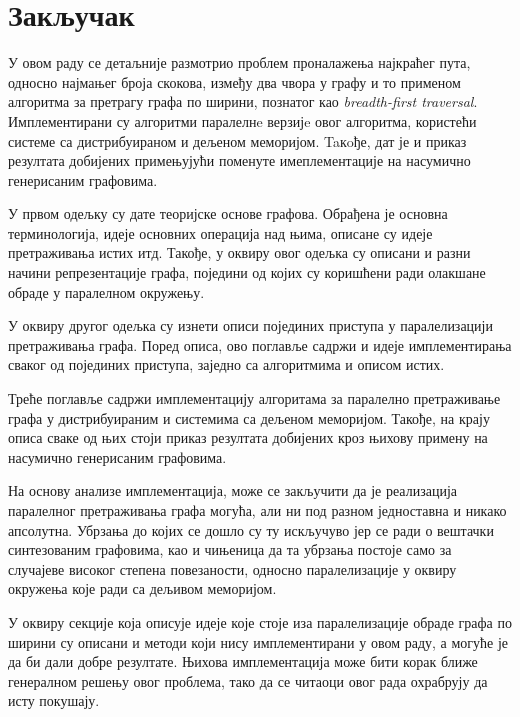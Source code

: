 \chapter{Закључак}
У овом раду се детаљније размотрио проблем проналажења најкраћег пута, односно најмањег броја скокова, између два чвора у графу и то применом алгоритма за претрагу графа по ширини, познатог као \textit{breadth-first traversal}. Имплементирани су алгоритми паралелнe верзијe овог алгоритма, користећи системе са дистрибуираном и дељеном меморијом. Taкoђе, дат је и приказ резултата добијених примењујући поменуте имеплементације на насумично генерисаним графовима.

\par
У првом одељку су дате теоријске основе графова. Обрађена је основна терминологија, идеје основних операција над њима, описане су идеје претраживања истих итд. Такође, у оквиру овог одељка су описани и разни начини репрезентације графа, поједини од којих су коришћени ради олакшане обраде у паралелном окружењу.

\par
У оквиру другог одељка су изнети описи појединих приступа у паралелизацији претраживања графа. Поред описа, ово поглавље садржи и идеје имплементирања сваког од појединих приступа, заједно са алгоритмима и описом истих. 

\par
Треће поглавље садржи имплементацију алгоритама за паралелно претраживање графа у дистрибуираним и системима са дељеном меморијом. Такође, на крају описа сваке од њих стоји приказ резултата добијених кроз њихову примену на насумично генерисаним графовима.

\par
На основу анализе имплементација, може се закључити да је реализација паралелног претраживања графа могућа, али ни под разном једноставна и никако апсолутна. Убрзања до којих се дошло су ту искључуво јер се ради о вештачки синтезованим графовима, као и чињеница да та убрзања постоје само за случајеве високог степена повезаности, односно паралелизације у оквиру окружења које ради са дељивом меморијом.

\par
У оквиру секције која описује идеје које стоје иза паралелизације обраде графа по ширини су описани и методи који нису имплементирани у овом раду, а могуће је да би дали добре резултате. Њихова имплементација може бити корак ближе генералном решењу овог проблема, тако да се читаоци овог рада охрабрују да исту покушају.